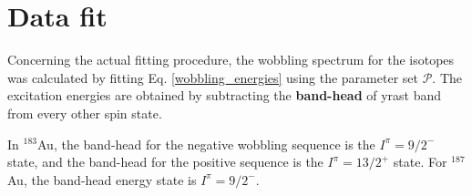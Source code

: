 \documentclass[12pt, a4paper]{article}
\begin{document}
\section{Data fit}

Concerning the actual fitting procedure, the wobbling spectrum for the isotopes was calculated by fitting Eq. \ref{wobbling_energies} using the parameter set $\mathcal{P}$. The excitation energies are obtained by subtracting the \textbf{band-head} of yrast band from every other spin state. 

In $^{183}$Au, the band-head for the negative wobbling sequence is the $I^\pi=9/2^-$ state, and the band-head for the positive sequence is the $I^\pi=13/2^+$ state. For $^{187}$Au, the band-head energy state is $I^\pi=9/2^-$.

\newpage


\end{document}
